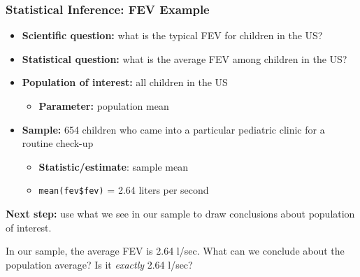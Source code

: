 \documentclass[12pt, 
hyperref={colorlinks=true, linkcolor=blue, urlcolor=cyan}]{beamer}
\begin{document}
\begin{frame}
\frametitle{Statistical Inference: FEV Example} %

\begin{itemize}
\item \textbf{Scientific question:} what is the typical FEV for children in the US? \pause
\item \textbf{Statistical question:} what is the average FEV among children in the US? \pause
\item \textbf{Population of interest:} all children in the US \pause
	\begin{itemize}
	\item \textbf{Parameter:} population mean \pause
	\end{itemize}
\item \textbf{Sample:} 654 children who came into a particular pediatric clinic for a routine check-up \pause
	\begin{itemize}
	\item \textbf{Statistic/estimate}: sample mean \pause
	\item[]\begin{footnotesize} \texttt{mean(fev\$fev)} = 2.64 liters per second \end{footnotesize}
	\end{itemize}
\end{itemize}

\vspace{-0.4cm} \textbf{Next step:} use what we see in our sample to draw conclusions about population of interest.\\ \begin{footnotesize}In our sample, the average FEV is 2.64 l/sec. What can we conclude about the population average? Is it \textit{exactly} 2.64 l/sec?\\ \end{footnotesize}

\end{frame}
\end{document}
